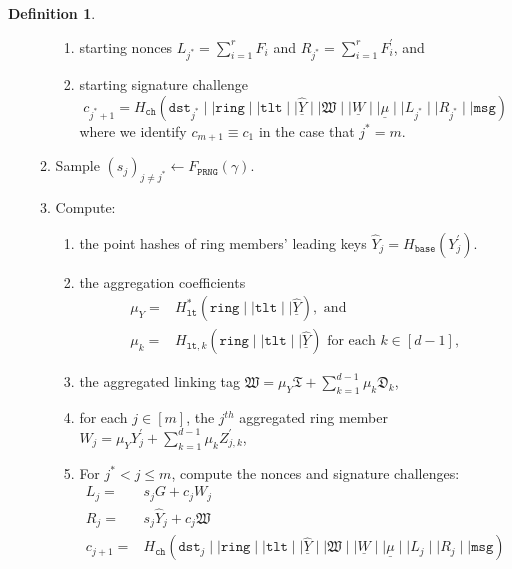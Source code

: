 \documentclass[11pt]{article}
\theoremstyle{definition}
\newtheorem{definition}[definition]{Definition}
\newcommand{\vk}{\texttt{vk}}
\newcommand{\lt}{\texttt{lt}}
\newcommand{\tlt}{\texttt{tlt}}
\newcommand{\ring}{\texttt{ring}}
\newcommand{\msg}{\texttt{msg}}
\newcommand{\signaturequery}{(\texttt{dst}_{j} \mid \mid \ring \mid \mid \tlt \mid \mid \underline{\widehat{Y}} \mid \mid \mathfrak{W} \mid \mid \underline{W} \mid \mid \underline{\mu} \mid \mid L_{j} \mid \mid R_{j} \mid \mid \msg)}
\newcommand{\signaturequerystar}{(\texttt{dst}_{j^*} \mid \mid \ring \mid \mid \tlt \mid \mid \underline{\widehat{Y}} \mid \mid \mathfrak{W} \mid \mid \underline{W} \mid \mid \underline{\mu} \mid \mid L_{j^*} \mid \mid R_{j^*} \mid \mid \msg)}
\begin{document}
\begin{definition}
\begin{enumerate}
\begin{enumerate}
\begin{enumerate}
\item starting nonces $L_{j^*} = \sum_{i=1}^{r} F_i$ and $R_{j^*} = \sum_{i=1}^{r} F^\prime_i$, and
\item starting signature challenge \[c_{j^*+1} = H_{\texttt{ch}}\signaturequerystar\] where we identify $c_{m+1} \equiv c_1$ in the case that $j^* = m$.


\end{enumerate}

\item Sample $(s_j)_{j \neq j^*} \leftarrow F_{\texttt{PRNG}}(\gamma)$.


\item\label{step:commonstuff} Compute:
\begin{enumerate}

\item the point hashes of ring members' leading keys $\widehat{Y}_j = H_{\texttt{base}}(Y_j^\prime)$.

\item the aggregation coefficients
\begin{align*}
\mu_{Y} =& H_{\lt}^*(\ring  \mid \mid \tlt \mid \mid \underline{\widehat{Y}}), \text{ and} \\
\mu_{k} =& H_{\lt,k}(\ring \mid \mid \tlt \mid \mid \underline{\widehat{Y}})\text{ for each }k \in [d-1],
\end{align*}






\item the aggregated linking tag
$\mathfrak{W} = \mu_{Y} \mathfrak{T} + \sum_{k=1}^{d-1} \mu_{k} \mathfrak{D}_k$,



\item for each $j \in [m]$, the $j^{th}$ aggregated ring member $W_j = \mu_Y Y_j^\prime + \sum_{k=1}^{d-1} \mu_k Z_{j,k}^\prime$,




\item For $j^* < j \leq m$, compute the nonces and signature challenges:
\begin{align*}
L_j =& s_j G + c_j W_j \\ R_j =& s_j \widehat{Y}_j + c_j \mathfrak{W} \\
c_{j+1} =& H_{\texttt{ch}}\signaturequery %
\end{align*}


\end{enumerate}
\end{enumerate}
\end{enumerate}
\end{definition}
\end{document}
